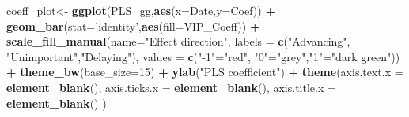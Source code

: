 \documentclass[
]{book}
\newenvironment{Shaded}{\begin{snugshade}}{\end{snugshade}}
\newcommand{\DataTypeTok}[1]{\textcolor[rgb]{0.13,0.29,0.53}{#1}}
\newcommand{\DecValTok}[1]{\textcolor[rgb]{0.00,0.00,0.81}{#1}}
\newcommand{\KeywordTok}[1]{\textcolor[rgb]{0.13,0.29,0.53}{\textbf{#1}}}
\newcommand{\NormalTok}[1]{#1}
\newcommand{\OperatorTok}[1]{\textcolor[rgb]{0.81,0.36,0.00}{\textbf{#1}}}
\newcommand{\StringTok}[1]{\textcolor[rgb]{0.31,0.60,0.02}{#1}}
\begin{document}
\begin{Shaded}
\begin{Highlighting}[]
\NormalTok{  coeff_plot<-}\StringTok{ }\KeywordTok{ggplot}\NormalTok{(PLS_gg,}\KeywordTok{aes}\NormalTok{(}\DataTypeTok{x=}\NormalTok{Date,}\DataTypeTok{y=}\NormalTok{Coef)) }\OperatorTok{+}
\StringTok{  }\KeywordTok{geom_bar}\NormalTok{(}\DataTypeTok{stat=}\StringTok{'identity'}\NormalTok{,}\KeywordTok{aes}\NormalTok{(}\DataTypeTok{fill=}\NormalTok{VIP_Coeff)) }\OperatorTok{+}
\StringTok{  }\KeywordTok{scale_fill_manual}\NormalTok{(}\DataTypeTok{name=}\StringTok{"Effect direction"}\NormalTok{, }
                    \DataTypeTok{labels =} \KeywordTok{c}\NormalTok{(}\StringTok{"Advancing"}\NormalTok{, }\StringTok{"Unimportant"}\NormalTok{,}\StringTok{"Delaying"}\NormalTok{), }
                    \DataTypeTok{values =} \KeywordTok{c}\NormalTok{(}\StringTok{"-1"}\NormalTok{=}\StringTok{"red"}\NormalTok{, }\StringTok{"0"}\NormalTok{=}\StringTok{"grey"}\NormalTok{,}\StringTok{"1"}\NormalTok{=}\StringTok{"dark green"}\NormalTok{)) }\OperatorTok{+}
\StringTok{  }\KeywordTok{theme_bw}\NormalTok{(}\DataTypeTok{base_size=}\DecValTok{15}\NormalTok{) }\OperatorTok{+}
\StringTok{  }\KeywordTok{ylab}\NormalTok{(}\StringTok{"PLS coefficient"}\NormalTok{) }\OperatorTok{+}
\StringTok{  }\KeywordTok{theme}\NormalTok{(}\DataTypeTok{axis.text.x =} \KeywordTok{element_blank}\NormalTok{(),}
        \DataTypeTok{axis.ticks.x =} \KeywordTok{element_blank}\NormalTok{(),}
        \DataTypeTok{axis.title.x =} \KeywordTok{element_blank}\NormalTok{() )}
  

\end{Highlighting}
\end{Shaded}
\end{document}
